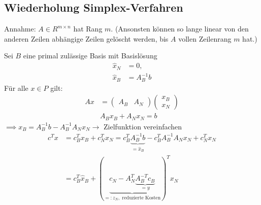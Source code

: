 \subsection{Wiederholung Simplex-Verfahren}
Annahme: $A \in R^{m \times n}$ hat Rang $m$. (Ansonsten können so lange linear von den anderen Zeilen abhängige Zeilen gelöscht werden, bis $A$ vollen Zeilenrang $m$ hat.)

Sei $B$ eine primal zulässige Basis mit Basislösung
\begin{align*}
	\hat{x}_{N}&=0,\\
	\hat{x}_{B}&= A_{B}^{-1}b
\end{align*}
Für alle $x \in P$ gilt:
\begin{align*}
	Ax&=
	\begin{pmatrix}
		A_{B} & A_{N}
	\end{pmatrix}
	\begin{pmatrix}
		x_{B} \\ x_{N}
	\end{pmatrix}
	\\
	  & A_{B}x_{B} + A_{N}x_{N}= b
\end{align*}
$\implies x_{B} = A_{B}^{-1}b - A_{B}^{-1}A_{N}x_{N} \to$ Zielfunktion vereinfachen
\begin{align*}
	c^Tx&= c_{B}^Tx_{B} + c_{N}^Tx_{N} = c_{B}^T \underbrace{A_{B}^{-1}b}_{= \hat{x}_{B}} - c_{B}^TA_{B}^{-1}A_{N}x_{N} + c_{N}^Tx_{N}\\
		&= c^{T}_{B} \hat{x}_{B} +( \underbrace{ c_{N} - A_{N}^{T} \underbrace{A_{B}^{-T}c_{B}}_{=y} }_{=: z_{N}, \text{ reduzierte Kosten}} )^{T} x_{N}
\end{align*}

